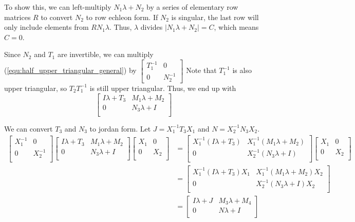 \documentclass{article}
\newcommand{\0}{\mathbf{0}}
\newcommand{\inv}{^{-1}}
\begin{document}
To show this, we can left-multiply $N_1\lambda+N_2$ by a series of elementary row matrices $R$ to convert $N_2$ to row echleon form. If $N_2$ is singular, the last row will only include elements from $RN_1\lambda$. Thus, $\lambda$ divides $|N_1\lambda+N_2|=C$, which means $C=0$.

Since $N_2$ and $T_1$ are invertible, we can multiply (\ref{equ:half_upper_triangular_general}) by $\begin{bmatrix}
    T_1^{-1}&0\\0&N_2^{-1}
\end{bmatrix}$
Note that $T_1^{-1}$ is also upper triangular, so $T_2T_1^{-1}$ is still upper triangular.
Thus, we end up with
\begin{equation}
    \label{equ:half_upper_triangular_diag}
    \begin{bmatrix}
        I\lambda+T_3&M_1\lambda+M_2\\
        0&N_3\lambda+I\\
    \end{bmatrix}
\end{equation}

We can convert $T_3$ and $N_3$ to jordan form. Let $J=X_1\inv T_3X_1$ and $N=X_2\inv N_3X_2$.
\begin{align*}
    \begin{bmatrix}X_1\inv&0\\0&X_2\inv\\\end{bmatrix}\begin{bmatrix}I\lambda+T_3&M_1\lambda+M_2\\0&N_3\lambda+I\\\end{bmatrix}\begin{bmatrix}X_1&0\\0&X_2\\\end{bmatrix}
    &=\begin{bmatrix}X_1\inv(I\lambda+T_3)&X_1\inv(M_1\lambda+M_2)\\0&X_2\inv(N_3\lambda+I)\\\end{bmatrix}\begin{bmatrix}X_1&0\\0&X_2\\\end{bmatrix}\\
    &=\begin{bmatrix}X_1\inv(I\lambda+T_3)X_1&X_1\inv(M_1\lambda+M_2)X_2\\0&X_2\inv(N_3\lambda+I)X_2\\\end{bmatrix}\\
    &=\begin{bmatrix}I\lambda+J&M_3\lambda+M_4\\0&N\lambda+I\\\end{bmatrix}
\end{align*}
\end{document}
